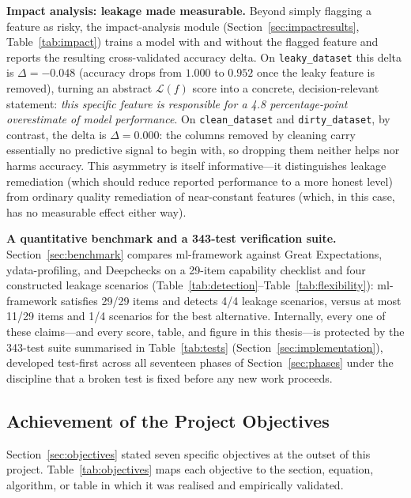 \documentclass[12pt,a4paper]{report}
\begin{document}
\textbf{Impact analysis: leakage made measurable.}  Beyond simply flagging a feature as
risky, the impact-analysis module (Section~\ref{sec:impactresults}, Table~\ref{tab:impact})
trains a model with and without the flagged feature and reports the resulting
cross-validated accuracy delta.  On \texttt{leaky\_dataset} this delta is
$\Delta{=}{-}0.048$ (accuracy drops from $1.000$ to $0.952$ once the leaky feature is
removed), turning an abstract $\mathcal{L}(f)$ score into a concrete, decision-relevant
statement: \emph{this specific feature is responsible for a 4.8 percentage-point
overestimate of model performance}.  On \texttt{clean\_dataset} and \texttt{dirty\_dataset},
by contrast, the delta is $\Delta{=}0.000$: the columns removed by cleaning carry
essentially no predictive signal to begin with, so dropping them neither helps nor harms
accuracy.  This asymmetry is itself informative---it distinguishes leakage remediation
(which should reduce reported performance to a more honest level) from ordinary quality
remediation of near-constant features (which, in this case, has no measurable effect
either way).

\textbf{A quantitative benchmark and a 343-test verification suite.}  Section~\ref{sec:benchmark}
compares ml-framework against Great Expectations, ydata-profiling, and Deepchecks on a
29-item capability checklist and four constructed leakage scenarios
(Table~\ref{tab:detection}--Table~\ref{tab:flexibility}): ml-framework satisfies 29/29 items
and detects 4/4 leakage scenarios, versus at most 11/29 items and 1/4 scenarios for the best
alternative.  Internally, every one of these claims---and every score, table, and figure in
this thesis---is protected by the 343-test suite summarised in Table~\ref{tab:tests}
(Section~\ref{sec:implementation}), developed test-first across all seventeen phases of
Section~\ref{sec:phases} under the discipline that a broken test is fixed before any new work
proceeds.

\subsection{Achievement of the Project Objectives}

Section~\ref{sec:objectives} stated seven specific objectives at the outset of this project.
Table~\ref{tab:objectives} maps each objective to the section, equation, algorithm, or table
in which it was realised and empirically validated.
\end{document}
